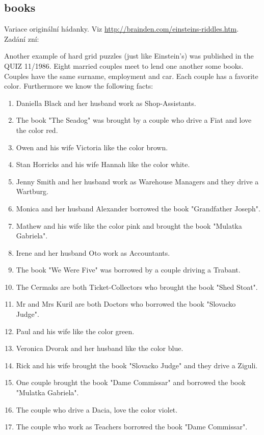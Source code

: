 \documentclass[11pt]{article} %
\begin{document}
\subsection{books}
Variace originální hádanky. Viz \url{http://brainden.com/einsteins-riddles.htm}. Zadání zní:
\begin{framed}

Another example of hard grid puzzles (just like Einstein's) was published in the QUIZ 11/1986.
 Eight married couples meet to lend one another some books. Couples have the same surname, employment and car. Each couple has a favorite color. Furthermore we know the following facts: 
\begin{enumerate} \itemsep1pt \parskip0pt 
\item Daniella Black and her husband work as Shop-Assistants.
\item The book "The Seadog" was brought by a couple who drive a Fiat and love the color red.
\item Owen and his wife Victoria like the color brown.
\item Stan Horricks and his wife Hannah like the color white.
\item Jenny Smith and her husband work as Warehouse Managers and they drive a Wartburg.
\item Monica and her husband Alexander borrowed the book "Grandfather Joseph".
\item Mathew and his wife like the color pink and brought the book "Mulatka Gabriela".
\item Irene and her husband Oto work as Accountants.
\item The book "We Were Five" was borrowed by a couple driving a Trabant.
\item The Cermaks are both Ticket-Collectors who brought the book "Shed Stoat".
\item Mr and Mrs Kuril are both Doctors who borrowed the book "Slovacko Judge".
\item Paul and his wife like the color green.
\item Veronica Dvorak and her husband like the color blue.
\item Rick and his wife brought the book "Slovacko Judge" and they drive a Ziguli.
\item One couple brought the book "Dame Commissar" and borrowed the book "Mulatka Gabriela".
\item The couple who drive a Dacia, love the color violet.
\item The couple who work as Teachers borrowed the book "Dame Commissar".

\end{enumerate}
\end{framed}
\end{document}
